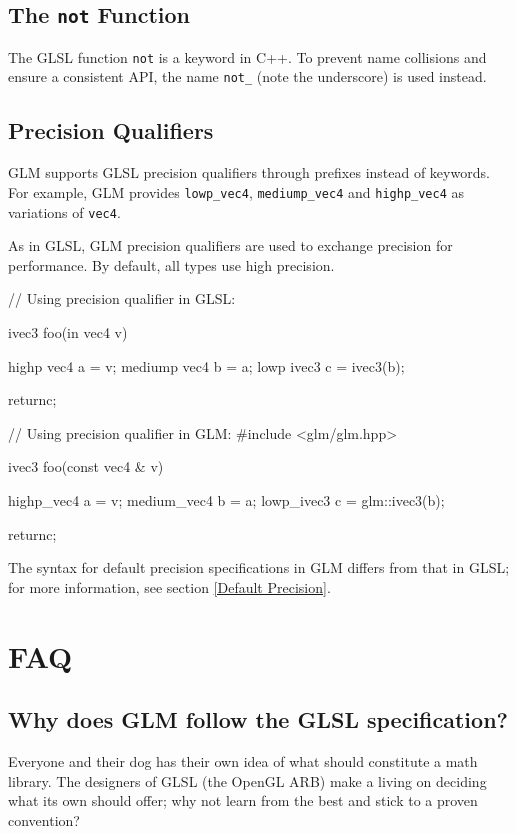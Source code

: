 \documentclass{scrartcl}
\numberwithin{figure}{subsection}
\begin{document}
\subsection{The \texttt{not} Function}

The GLSL function \verb|not| is a keyword in C++. To prevent name collisions and ensure a consistent API, the name \verb|not_| (note the underscore) is used instead.

\subsection{Precision Qualifiers}

GLM supports GLSL precision qualifiers through prefixes instead of keywords. For example, GLM provides \verb|lowp_vec4|, \verb|mediump_vec4| and \verb|highp_vec4| as variations of \verb|vec4|.

As in GLSL, GLM precision qualifiers are used to exchange precision for performance.  By default, all types use high precision.

\begin{glslcode}
// Using precision qualifier in GLSL:

ivec3 foo(in vec4 v)
{
  highp vec4 a = v;
  mediump vec4 b = a;
  lowp ivec3 c = ivec3(b);

  returnc;
}
\end{glslcode}

\begin{cppcode}
// Using precision qualifier in GLM:
#include <glm/glm.hpp>

ivec3 foo(const vec4 & v)
{
  highp_vec4 a = v;
  medium_vec4 b = a;
  lowp_ivec3 c = glm::ivec3(b);

  returnc;
}
\end{cppcode}

The syntax for default precision specifications in GLM differs from that in GLSL; for more information, see section \ref{Default Precision}.

\newpage{}

\section{FAQ}

\subsection{Why does GLM follow the GLSL specification?}

Everyone and their dog has their own idea of what should constitute a math library.  The designers of GLSL (the OpenGL ARB) make a living on deciding what its own should offer; why not learn from the best and stick to a proven convention?
\end{document}
